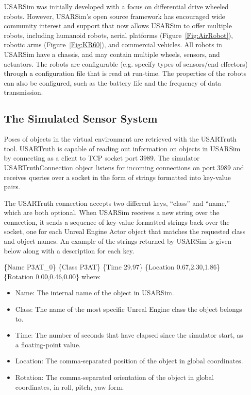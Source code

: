 USARSim was initially developed with a focus on differential drive wheeled robots. However, USARSim's open source framework has encouraged wide community interest and support that now allows USARSim to offer multiple robots, including humanoid robots, aerial platforms (Figure~\ref{Fig:AirRobot}), robotic arms (Figure~\ref{Fig:KR60}), and commercial vehicles. All robots in USARSim have a chassis, and may contain multiple wheels, sensors, and
actuators. The robots are configurable (e.g. specify types of
sensors/end effectors) through a configuration file that is read at run-time. The properties of the robots can
also be configured, such as the battery life and the frequency of
data transmission.

\subsection{The Simulated Sensor System}
\label{subsection:usartruth}
Poses of objects in the virtual environment are retrieved with the USARTruth tool. USARTruth is capable of reading out information on objects in USARSim by connecting as a client to TCP socket port 3989. The simulator USARTruthConnection object listens for incoming connections on port 3989 and receives queries over a socket in the form of strings formatted into key-value pairs. 

The USARTruth connection accepts two different keys, ``class'' and ``name,'' which are both optional. When USARSim receives a new string over the connection, it sends a sequence of key-value formatted strings back over the socket, one for each Unreal Engine Actor object that matches the requested class and object names. An example of the strings returned by USARSim is given below along with a description for each key.


\{Name P3AT\_0\} \{Class P3AT\} \{Time 29.97\} \{Location 0.67,2.30,1.86\} \\ \{Rotation 0.00,0.46,0.00\} where:

\begin{itemize}
\item Name: The internal name of the object in USARSim.
\item Class: The name of the most specific Unreal Engine class the object belongs to.
\item Time: The number of seconds that have elapsed since the simulator start, as a floating-point value.
\item Location: The comma-separated position of the object in global coordinates.
\item Rotation: The comma-separated orientation of the object in global coordinates, in roll, pitch, yaw form.
\end{itemize}


